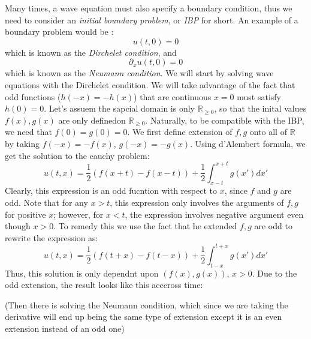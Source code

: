 \documentclass{book}
\newcommand{\R}{{\mathbb{R}}}
\begin{document}
Many times, a wave equation must also specify a boundary condition, thus we need to consider an \emph{initial boundary
problem}, or \emph{IBP} for short. An example of a boundary problem would be :
\[
	u(t,0) = 0
\]
which is known as the \emph{Dirchelet condition}, and
\[
	\partial_x u(t,0)  =0
\]
which is known as the \emph{Neumann condition}. We will start by solving wave equations with the Dirchelet condition.
We will take advantage of the fact that odd functions ($h(-x) = -h(x)$) that are continuous $x = 0$ must satisfy $h(0)
= 0$. Let's assuem the sapcial domain is only $\R_{\ge 0}$, so that the inital values $f(x), g(x)$ are only definedon
$\R_{\ge 0}$. Naturally, to be compatible with the IBP, we need that $f(0) = g(0) = 0$. We first define extension of
$f,g$ onto all of $\R$ by taking $f(-x) = -f(x)$, $g(-x) = -g(x)$. Using d'Alembert formula, we get the solution to the
cauchy problem:
\[
	u(t,x) = \frac{1}{2} \left( f(x+t) - f(x-t)\right) + \frac{1}{2}\int_{x-t}^{x+t} g(x')dx'
\]
Clearly, this expression is an odd fucntion with respect to $x$, since $f$ and $g$ are odd. Note that for any $x > t$,
this expression only involves the arguments of $f,g$ for positive $x$; however, for $x < t$, the expression involves
negative argument even though $x > 0$. To remedy this we use the fact that he extended $f,g$ are odd to rewrite the
expression as:
\[
	u(t,x) = \frac{1}{2} \left( f(t+x) - f(t-x)\right) + \frac{1}{2}\int_{t-x}^{t+x} g(x')dx'
\]
Thus, this solution is only dependnt upon $(f(x), g(x))$, $x > 0$. Due to the odd extension, the result looks like this
acccross time:

(Then there is solving the Neumann condition, which since we are taking the derivative will end up being the same type
of extension except it is an even extension instead of an odd one)
\end{document}
